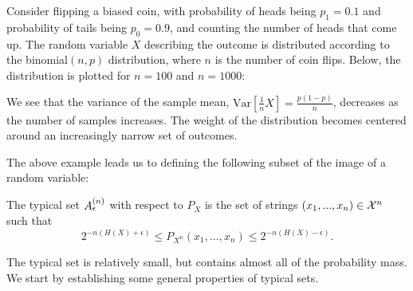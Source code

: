 \begin{example}
Consider flipping a biased coin, with probability of heads being $p_1 = 0.1$ and probability of tails being $p_0 = 0.9$, and counting the number of heads that come up. The random variable $X$ describing the outcome is distributed according to the binomial$(n,p)$ distribution, where $n$ is the number of coin flips. Below, the distribution is plotted for $n = 100$ and $n = 1000$:
\begin{center}
\end{center}
We see that the variance of the sample mean, $\mbox{Var}[\frac{1}{n}X] = \frac{p(1-p)}{n}$, decreases as the number of samples increases. The weight of the distribution becomes centered around an increasingly narrow set of outcomes.
\end{example}
The above example leads us to defining the following subset of the image of a random variable:

\begin{definition}\label{def:typset}
The typical set $A_{\epsilon}^{(n)}$ with respect to $P_X$ is the set of strings $(x_1, ..., x_n) \in {\cal X}^n$ such that
\[
2^{-n (H(X) + \epsilon)} \leq P_{X^n}(x_1, ..., x_n) \leq 2^{-n(H(X) - \epsilon)}.
\]
\end{definition}
The typical set is relatively small, but contains almost all of the probability mass. We start by establishing some general properties of typical sets.

